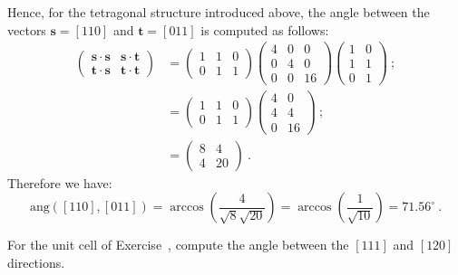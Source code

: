 \begin{example}
Hence, for the tetragonal structure introduced above, the angle between the vectors $\mathbf{s}=[110]$ and $\mathbf{t}=[011]$ is computed as follows:
\begin{align*}
	\left(\begin{array}{cc}\mathbf{s}\cdot\mathbf{s}&\mathbf{s}\cdot\mathbf{t}\\
	\mathbf{t}\cdot\mathbf{s}&\mathbf{t}\cdot\mathbf{t}\end{array}\right) &= \left(\begin{array}{ccc}1 & 1 & 0\\ 0 & 1 & 1\end{array}\right)
	\left(\begin{array}{ccc}
			4 & 0 & 0\\
			0 & 4 & 0\\
			0 & 0 & 16\end{array}\right)\left(\begin{array}{cc} 1 & 0\\ 1 & 1\\ 0 & 1\end{array}\right)\ ;\\
	&= \left(\begin{array}{ccc}1 & 1 & 0\\ 0 & 1 & 1\end{array}\right)
	\left(\begin{array}{cc} 4 & 0\\ 4 & 4\\ 0 & 16\end{array}\right)\ ; \\
	&= \left(\begin{array}{cc}8 & 4 \\ 4 & 20 \end{array}\right)\ .
\end{align*}
Therefore we have:
\[
	\text{ang}([110],[011]) = \arccos\left(\frac{4}{\sqrt{8}\sqrt{20}}\right) = \arccos\left(\frac{1}{\sqrt{10}}\right) = 71.56^{\circ}\ .
\]
\end{example}

\begin{exercise}
For the unit cell of Exercise~, compute the angle between the $[111]$ and $[120]$ directions.
\end{exercise}

